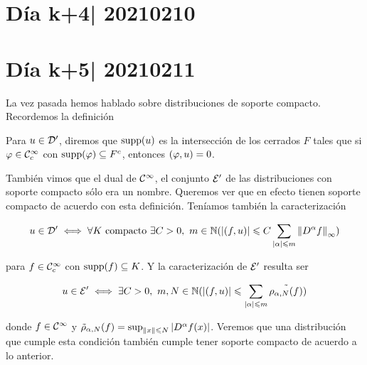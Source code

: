 \documentclass[12pt]{memoir}
\begin{document}
\section{Día k+4| 20210210}
\section{Día k+5| 20210211}

La vez pasada hemos hablado sobre distribuciones de soporte compacto. Recordemos la definición 

\begin{Def}
  Para $u\in\mathcal{D}'$, diremos que $\operatorname{supp}(u)$ es la intersección de los cerrados $F$ tales que si $\varphi\in\mathcal{C}^\infty_c$ con $\operatorname{supp}(\varphi)\subseteq F^c$, entonces $(\varphi,u)=0$. %
\end{Def}

También vimos que el dual de $\mathcal{C}^\infty$, el conjunto $\mathcal{E}'$ de las distribuciones con soporte compacto sólo era un nombre. Queremos ver que en efecto tienen soporte compacto de acuerdo con esta definición. Teníamos también la caracterización

$$u\in\cD'\iff \forall K\ \text{compacto}\ \exists C>0,\ m\in\bN(|(f,u)|\leq C\sum_{|\al|\leq m}\nm{D^\al f}_\infty)$$

para $f\in\mathcal{C}^\infty_c$ con $\operatorname{supp}(f)\subseteq K$. Y la caracterización de $\mathcal{E}'$ resulta ser 

$$u\in\cE'\iff \exists C>0,\ m,N\in\bN(|(f,u)|\leq \sum_{|\al|\leq m}\tilde{\rho_{\al,N}(f)})$$

donde $f\in\mathcal{C}^\infty$ y $\tilde{\rho}_{\alpha,N}(f)=\sup_{\left\|x\right\|\leqslant N}|D^\alpha f(x)|$. Veremos que una distribución que cumple esta condición también cumple tener soporte compacto de acuerdo a lo anterior.
\end{document}
